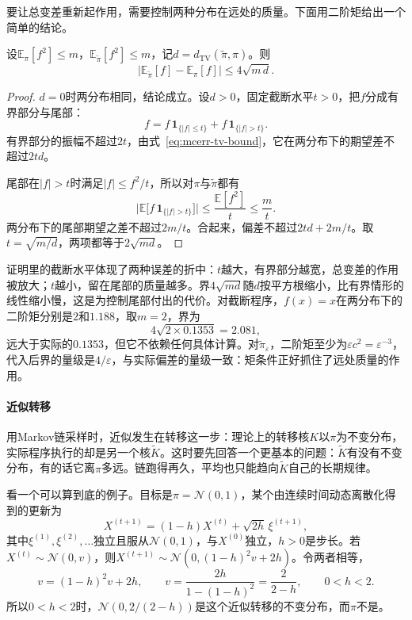 要让总变差重新起作用，需要控制两种分布在远处的质量。下面用二阶矩给出一个简单的结论。

\begin{lemma}[矩控制下的偏差界]
\label{lem:mcerr-moment-tv}
设$\mathbb{E}_{\pi}[f^{2}]\leq m$，$\mathbb{E}_{\tilde{\pi}}[f^{2}]\leq m$，记$d=d_{\mathrm{TV}}(\tilde{\pi},\pi)$。则
\begin{equation}
 \bigl\lvert\mathbb{E}_{\tilde{\pi}}[f]-\mathbb{E}_{\pi}[f]\bigr\rvert\leq4\sqrt{m\,d} .
 \label{eq:mcerr-moment-tv}
\end{equation}
\end{lemma}

\begin{proof}
$d=0$时两分布相同，结论成立。设$d>0$，固定截断水平$t>0$，把$f$分成有界部分与尾部：
\[
 f=f\,\mathbf{1}_{\{\lvert f\rvert\leq t\}}+f\,\mathbf{1}_{\{\lvert f\rvert>t\}} .
\]
有界部分的振幅不超过$2t$，由式~\eqref{eq:mcerr-tv-bound}，它在两分布下的期望差不超过$2td$。

尾部在$\lvert f\rvert>t$时满足$\lvert f\rvert\leq f^{2}/t$，所以对$\pi$与$\tilde{\pi}$都有
\[
 \bigl\lvert\mathbb{E}\bigl[f\,\mathbf{1}_{\{\lvert f\rvert>t\}}\bigr]\bigr\rvert\leq\frac{\mathbb{E}[f^{2}]}{t}\leq\frac{m}{t} .
\]
两分布下的尾部期望之差不超过$2m/t$。合起来，偏差不超过$2td+2m/t$。取$t=\sqrt{m/d}$，两项都等于$2\sqrt{md}$。
\end{proof}

证明里的截断水平体现了两种误差的折中：$t$越大，有界部分越宽，总变差的作用被放大；$t$越小，留在尾部的质量越多。界$4\sqrt{md}$随$d$按平方根缩小，比有界情形的线性缩小慢，这是为控制尾部付出的代价。对截断程序，$f(x)=x$在两分布下的二阶矩分别是$2$和$1.188$，取$m=2$，界为
\[
 4\sqrt{2\times0.1353}=2.081 ,
\]
远大于实际的$0.1353$，但它不依赖任何具体计算。对$\tilde{\pi}_{\varepsilon}$，二阶矩至少为$\varepsilon c^{2}=\varepsilon^{-3}$，代入后界的量级是$4/\varepsilon$，与实际偏差的量级一致：矩条件正好抓住了远处质量的作用。

\paragraph{近似转移}
用Markov链采样时，近似发生在转移这一步：理论上的转移核$K$以$\pi$为不变分布，实际程序执行的却是另一个核$\tilde{K}$。这时要先回答一个更基本的问题：$\tilde{K}$有没有不变分布，有的话它离$\pi$多远。链跑得再久，平均也只能趋向$\tilde{K}$自己的长期规律。

看一个可以算到底的例子。目标是$\pi=\mathcal{N}(0,1)$，某个由连续时间动态离散化得到的更新为
\[
 X^{(t+1)}=(1-h)X^{(t)}+\sqrt{2h}\,\xi^{(t+1)} ,
\]
其中$\xi^{(1)},\xi^{(2)},\dots$独立且服从$\mathcal{N}(0,1)$，与$X^{(0)}$独立，$h>0$是步长。若$X^{(t)}\sim\mathcal{N}(0,v)$，则$X^{(t+1)}\sim\mathcal{N}(0,(1-h)^{2}v+2h)$。令两者相等，
\[
 v=(1-h)^{2}v+2h,\qquad v=\frac{2h}{1-(1-h)^{2}}=\frac{2}{2-h},\qquad 0<h<2 .
\]
所以$0<h<2$时，$\mathcal{N}(0,2/(2-h))$是这个近似转移的不变分布，而$\pi$不是。

